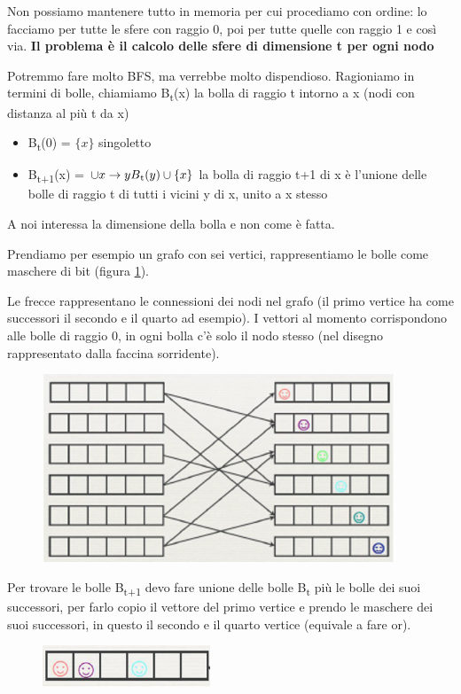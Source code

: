 \documentclass[12pt,italian]{report}
\begin{document}
Non possiamo mantenere tutto in memoria per cui procediamo con ordine: lo facciamo per tutte le sfere con raggio 0, poi per tutte quelle con raggio 1 e così via. 
\bigbreak
\noindent \textbf{Il problema è il calcolo delle sfere di dimensione t per ogni nodo}

\noindent Potremmo fare molto BFS, ma verrebbe molto dispendioso.
\bigbreak
\noindent Ragioniamo in termini di bolle, chiamiamo B\textsubscript{t}(x) la bolla di raggio t intorno a x (nodi con distanza al più t da x)

\begin{itemize}
    \item B\textsubscript{t}(0) = $\{x\}$ singoletto
    \item B\textsubscript{t+1}(x) = $\cup x\rightarrow{y} B\textsubscript{t}(y) \cup{\{x\}} $ la bolla di raggio t+1 di x è l'unione delle bolle di raggio t di tutti i vicini y di x, unito a x stesso
\end{itemize}

\noindent A noi interessa la dimensione della bolla e non come è fatta. 
\bigbreak

\noindent Prendiamo per esempio un grafo con sei vertici, rappresentiamo le bolle come maschere di bit (figura \ref{fig:hyperball1}).

Le frecce rappresentano le connessioni dei nodi nel grafo (il primo vertice ha come successori il secondo e il quarto ad esempio). I vettori al momento corrispondono alle bolle di raggio 0, in ogni bolla c'è solo il nodo stesso (nel disegno rappresentato dalla faccina sorridente).
\begin{figure}[h]
	\centering
	\includegraphics[width=105mm]{image/hyperball1.png}
	\caption{}
	\label{fig:hyperball1}
\end{figure}
Per trovare le bolle B\textsubscript{t+1} devo fare unione delle bolle B\textsubscript{t} più le bolle dei suoi successori, per farlo copio il vettore del primo vertice e prendo le maschere dei suoi successori, in questo il secondo e il quarto vertice (equivale a fare or).
\begin{figure}[h]
	\centering
	\includegraphics[width=50mm]{image/hyperball2.png}
	\label{fig:hyperball2}
\end{figure}
\end{document}
